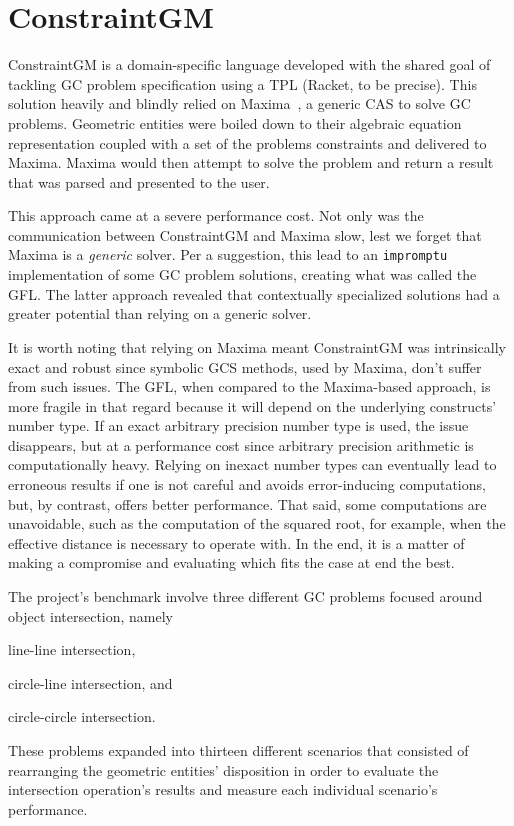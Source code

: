 \section{ConstraintGM}%
\label{sec:eval.cgm}

ConstraintGM is a domain-specific language developed with the shared goal of
tackling \ac{GC} problem specification using a \ac{TPL} (Racket, to be precise).
This solution heavily and blindly relied on Maxima~\cite{Maxima:2021:Maxima}, a
generic \ac{CAS} to solve \ac{GC} problems.  Geometric entities were boiled down
to their algebraic equation representation coupled with a set of the problems
constraints and delivered to Maxima.  Maxima would then attempt to solve the
problem and return a result that was parsed and presented to the user.

This approach came at a severe performance cost.  Not only was the communication
between ConstraintGM and Maxima slow, lest we forget that Maxima is a
\emph{generic} solver.  Per a suggestion, this lead to an \texttt{impromptu}
implementation of some \ac{GC} problem solutions, creating what was called the
\ac{GFL}. The latter approach revealed that contextually specialized solutions
had a greater potential than relying on a generic solver.

It is worth noting that relying on Maxima meant ConstraintGM was intrinsically
exact and robust since symbolic \ac{GCS} methods, used by Maxima, don't suffer
from such issues.  The \ac{GFL}, when compared to the Maxima-based approach, is
more fragile in that regard because it will depend on the underlying constructs'
number type.  If an exact arbitrary precision number type is used, the issue
disappears, but at a performance cost since arbitrary precision arithmetic is
computationally heavy.  Relying on inexact number types can eventually lead to
erroneous results if one is not careful and avoids error-inducing computations,
but, by contrast, offers better performance.  That said, some computations are
unavoidable, such as the computation of the squared root, for example, when the
effective distance is necessary to operate with.  In the end, it is a matter of
making a compromise and evaluating which fits the case at end the best.

The project's benchmark involve three different \ac{GC} problems focused around
object intersection, namely
\begin{enumerate*}[label= (\arabic*)]
  \item line-line intersection,
  \item circle-line intersection, and
  \item circle-circle intersection.
\end{enumerate*}
These problems expanded into thirteen different scenarios that consisted of
rearranging the geometric entities' disposition in order to evaluate the
intersection operation's results and measure each individual scenario's
performance.

